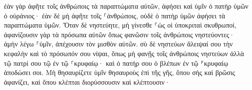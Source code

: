 \documentclass{openreader}
\begin{document}
ἐὰν γὰρ ἀφῆτε τοῖς ἀνθρώποις τὰ παραπτώματα αὐτῶν, ἀφήσει καὶ ὑμῖν ὁ πατὴρ ὑμῶν ὁ οὐράνιος· 
ἐὰν δὲ μὴ ἀφῆτε τοῖς ⸀ἀνθρώποις, οὐδὲ ὁ πατὴρ ὑμῶν ἀφήσει τὰ παραπτώματα ὑμῶν. 
Ὅταν δὲ νηστεύητε, μὴ γίνεσθε ⸀ὡς οἱ ὑποκριταὶ σκυθρωποί, ἀφανίζουσιν γὰρ τὰ πρόσωπα αὐτῶν ὅπως φανῶσιν τοῖς ἀνθρώποις νηστεύοντες· ἀμὴν λέγω ⸀ὑμῖν, ἀπέχουσιν τὸν μισθὸν αὐτῶν. 
σὺ δὲ νηστεύων ἄλειψαί σου τὴν κεφαλὴν καὶ τὸ πρόσωπόν σου νίψαι, 
ὅπως μὴ φανῇς τοῖς ἀνθρώποις νηστεύων ἀλλὰ τῷ πατρί σου τῷ ἐν τῷ ⸀κρυφαίῳ· καὶ ὁ πατήρ σου ὁ βλέπων ἐν τῷ ⸁κρυφαίῳ ἀποδώσει σοι. 
Μὴ θησαυρίζετε ὑμῖν θησαυροὺς ἐπὶ τῆς γῆς, ὅπου σὴς καὶ βρῶσις ἀφανίζει, καὶ ὅπου κλέπται διορύσσουσιν καὶ κλέπτουσιν· 
\end{document}
